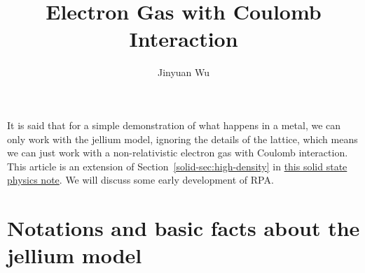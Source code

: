 \documentclass[hyperref, a4paper]{article}
\title{Electron Gas with Coulomb Interaction}
\author{Jinyuan Wu}
\newcommand{\soliddoc}{\href{../solid/solid.pdf}{this solid state physics note}}
\begin{document}
\maketitle

It is said that for a simple demonstration of what happens in a metal, we can only work with the jellium model,
ignoring the details of the lattice, which means we can just work with a non-relativistic electron gas with Coulomb
interaction.  This article is an extension of Section~\ref{solid-sec:high-density} in \soliddoc. We will discuss some early development of RPA.

\section{Notations and basic facts about the jellium model} 
\end{document}
